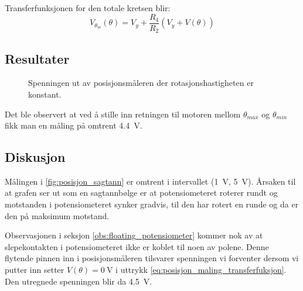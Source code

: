 Transferfunksjonen for den totale kretsen blir:
\begin{equation}
    \label{eq:posisjon_maling_transferfuksjon}
    V_{\theta_m}(\theta) = V_y + \frac{R_4}{R_2}(V_y + V(\theta))
\end{equation}







\subsection{Resultater}

\begin{figure}[h]
    \centering
    
    \caption{Spenningen ut av posisjonsmåleren der rotasjonshastigheten er konstant.}
    \label{fig:posisjon_sagtann}
\end{figure}

\label{obs:floating_potensiometer}
Det ble observert at ved å stille inn retningen til motoren mellom $\theta_{max}$ og $\theta_{min}$ fikk man en måling på omtrent \SI{4.4}{\volt}.








\subsection{Diskusjon}

Målingen i \autoref{fig:posisjon_sagtann} er omtrent i intervallet (\SI{1}{\volt}, \SI{5}{\volt}). Årsaken til at grafen ser ut som en sagtannbølge er at potensiometeret roterer rundt og motstanden i potensiometeret synker gradvis, til den har rotert en runde og da er den på maksimum motstand.


Observasjonen i seksjon \ref{obs:floating_potensiometer} kommer nok av at slepekontakten i potensiometeret ikke er koblet til noen av polene. Denne flytende pinnen inn i posisjonsmåleren tilsvarer spenningen vi forventer dersom vi putter inn setter $V(\theta) = \SI{0}{\volt}$ i uttrykk \eqref{eq:posisjon_maling_transferfuksjon}. Den utregnede spenningen blir da \SI{4.5}{\volt}.
